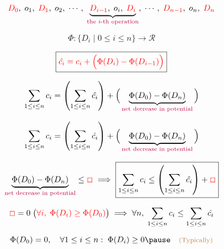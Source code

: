 
\begin{frame}{}
  \centerline{}

  \vspace{0.50cm}
\end{frame}

\begin{frame}{}
  \[
    \textcolor{red}{D_0},\; o_1,\; \textcolor{red}{D_1},\; o_2,\; \cdots,\; \underbrace{\textcolor{red}{D_{i-1}},\; o_{i},\; \textcolor{red}{D_{i}}}_{\text{\textcolor{purple}{the $i$-th operation}}},\; 
    \cdots,\; \textcolor{red}{D_{n-1}},\; o_{n},\; \textcolor{red}{D_{n}}
  \]

  \pause
  \vspace{0.50cm}
  \[
    \Phi: \Big\{D_{i} \mid 0 \le i \le n\Big\} \to \mathcal{R}
  \]

  \pause
  \vspace{0.30cm}
  \[
    \boxed{\textcolor{red}{\hat{c_i} = c_i + \Big(\Phi(D_{i}) - \Phi(D_{i-1})\Big)}}
  \]

  \pause
  \vspace{0.50cm}
  \[
    \sum_{1 \le i \le n} c_i = \left( \sum_{1 \le i \le n} \hat{c_i} \right) 
      + \Big(\underbrace{\Phi(D_{0}) - \Phi(D_{n})}_{\text{\textcolor{purple}{net decrease in potential}}} \Big)
  \]
\end{frame}

\begin{frame}{}
  \[
    \sum_{1 \le i \le n} c_i = \left( \sum_{1 \le i \le n} \hat{c_i} \right) 
      + \Big(\underbrace{\Phi(D_{0}) - \Phi(D_{n})}_{\text{\textcolor{purple}{net decrease in potential}}} \Big)
  \]

  \pause
  \vspace{0.30cm}
  \[
    \underbrace{\Phi(D_{0}) - \Phi(D_{n})}_{\text{\textcolor{purple}{net decrease in potential}}} \le \textcolor{red}{\Box}
    \implies
    \boxed{\sum_{1 \le i \le n} c_i \le \left( \sum_{1 \le i \le n} \hat{c_i} \right) + \textcolor{red}{\Box}}
  \]

  \pause
  \vspace{0.30cm}
  \[
    \textcolor{red}{\Box} = 0 \;\big(\textcolor{red}{\forall i,\; \Phi(D_i) \ge \Phi(D_0)}\big)
    \implies 
    \forall n,\; \sum_{1 \le i \le n} c_i \le \sum_{1 \le i \le n} \hat{c_i}
  \]


  \pause
  \vspace{0.30cm}
  \[
    \Phi(D_{0}) = 0,\quad \forall 1 \le i \le n:\; \Phi(D_{i}) \ge 0 \pause \quad \text{\brown{\footnotesize (Typically)}}
  \]
\end{frame}


